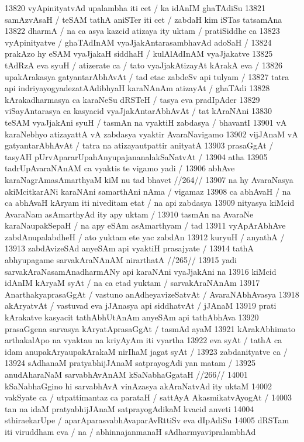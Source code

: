 13820 vyApinityatvAd upalambha iti cet / ka idAnIM ghaTAdiSu
13821 samAzvAsaH / teSAM tathA aniSTer iti cet / zabdaH kim iSTas tatsamAna
13822 dharmA / na ca asya kazcid atizaya ity uktam / pratiSiddhe ca
13823 vyApinityatve / ghaTAdInAM vyaJjakAntarasambhavAd adoSaH /  
13824 prakAzo hy eSAM vyaJjakaH siddhaH / kulAlAdInAM vyaJjakatve 
13825 tAdRzA eva syuH / atizerate ca / tato vyaJjakAtizayAt kArakA eva / 
13826 upakArakasya gatyantarAbhAvAt / tad etac zabdeSv api tulyam / 
13827 tatra api indriyayogyadezatAAdibhyaH karaNAnAm atizayAt / ghaTAdi
13828 kArakadharmasya ca karaNeSu dRSTeH / tasya eva pradIpAder  
13829 viSayAntarasya ca kasyacid vyaJjakAntarAbhAvAt / tat kAraNAni  
13830 teSAM vyaJjakAni syuH / tasmAn na vyaktiH zabdasya / bhavantI
13901 vA karaNebhyo atizayattA vA zabdasya vyaktir AvaraNavigamo  
13902 vijJAnaM vA gatyantarAbhAvAt / tatra na atizayautpattir anityatA
13903 prasaGgAt / tasyAH pUrvApararUpahAnyupajananalakSaNatvAt /
13904 atha 
13905 	tadrUpAvaraNAnAM ca vyaktis te vigamo yadi /
13906 	abhAve karaNagrAmasAmarthyaM kiM nu tad bhavet //264// 
13907 na hy AvaraNasya akiMcitkarANi karaNAni samarthAni nAma / vigamaz 
13908 ca abhAvaH / na ca abhAvaH kAryam iti niveditam etat / na api zabdasya 
13909 nityasya kiMcid AvaraNam asAmarthyAd ity apy uktam / 
13910 tasmAn na AvaraNe karaNaupakSepaH / na apy eSAm asAmarthyam / tad
13911 vyApArAbhAve zabdAnupalabdheH / ato yuktam ete yac zabdAn
13912 kuryuH / anyathA / 
13913 	zabdAvizeSAd anyeSAm api vyaktiH prasajyate /  
13914 	tathA abhyupagame sarvakAraNAnAM nirarthatA //265//
13915 yadi sarvakAraNasamAnadharmANy api karaNAni vyaJjakAni na
13916 kiMcid idAnIM kAryaM syAt / na ca etad yuktam / sarvakAraNAnAm 
13917 AnarthakyaprasaGgAt / vastuno anAdheyavizeSatvAt / AvaraNAbhAvasya
13918 akAryatvAt / vastuvad eva jJAnasya api siddhatvAt / jJAnaM 
13919 prati kArakatve kasyacit tathAbhUtAnAm anyeSAm api tathAbhAva 
13920 prasaGgena sarvasya kAryatAprasaGgAt / tasmAd ayaM 
13921 kArakAbhimato arthakalApo na vyaktau na kriyAyAm iti vyartha 
13922 eva syAt / tathA ca idam anupakAryaupakArakaM nirIhaM jagat syAt / 
13923 zabdanityatve ca / 
13924 	sAdhanaM pratyabhijJAnaM satprayogAdi yan matam /  
13925 	anudAharaNaM sarvabhAvAnAM kSaNabhaGgataH //266//  
14001 kSaNabhaGgino hi sarvabhAvA vinAzasya akAraNatvAd ity uktaM  
14002 vakSyate ca / utpattimantaz ca parataH / sattAyA AkasmikatvAyogAt / 
14003 tan na idaM pratyabhijJAnaM satprayogAdikaM kvacid anveti
14004 sthiraekarUpe / aparAparasvabhAvaparAvRttiSv eva dIpAdiSu  
14005 dRSTam iti viruddham eva / na / abhinnajanmanaH sAdharmyavipralambhAd 
